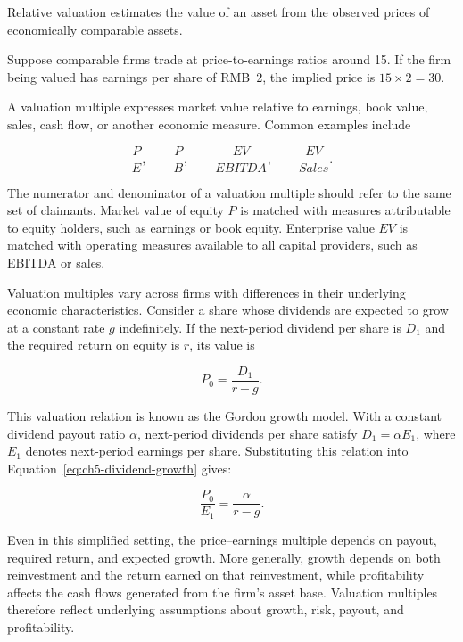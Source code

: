 Relative valuation estimates the value of an asset from the observed prices of economically comparable assets.

Suppose comparable firms trade at price-to-earnings ratios around 15. If the firm being valued has earnings per share of RMB~2, the implied price is $15\times 2=30$.

A valuation multiple expresses market value relative to earnings, book value, sales, cash flow, or another economic measure. Common examples include

\begin{equation*}
\frac{P}{E},
\qquad
\frac{P}{B},
\qquad
\frac{EV}{EBITDA},
\qquad
\frac{EV}{Sales}.
\label{eq:ch5-common-multiples}
\end{equation*}

The numerator and denominator of a valuation multiple should refer to the same set of claimants. Market value of equity $P$ is matched with measures attributable to equity holders, such as earnings or book equity. Enterprise value $EV$ is matched with operating measures available to all capital providers, such as EBITDA or sales.

Valuation multiples vary across firms with differences in their underlying economic characteristics. Consider a share whose dividends are expected to grow at a constant rate $g$ indefinitely. If the next-period dividend per share is $D_1$ and the required return on equity is $r$, its value is

\begin{equation}
P_0=\frac{D_1}{r-g}.
\label{eq:ch5-dividend-growth}
\end{equation}

This valuation relation is known as the Gordon growth model.
With a constant dividend payout ratio $\alpha$, next-period dividends per share satisfy $D_1=\alpha E_1$, where $E_1$ denotes next-period earnings per share. Substituting this relation into Equation~\eqref{eq:ch5-dividend-growth} gives:

\begin{equation}
\frac{P_0}{E_1}=\frac{\alpha}{r-g}.
\label{eq:ch5-pe-drivers}
\end{equation}

Even in this simplified setting, the price--earnings multiple depends on payout, required return, and expected growth. More generally, growth depends on both reinvestment and the return earned on that reinvestment, while profitability affects the cash flows generated from the firm's asset base. Valuation multiples therefore reflect underlying assumptions about growth, risk, payout, and profitability.

